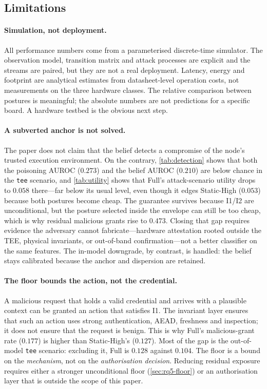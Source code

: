 \subsection{Limitations}
\label{sec:limitations}

\paragraph{Simulation, not deployment.} All performance numbers come from a
parameterised discrete-time simulator. The observation model, transition matrix
and attack processes are explicit and the streams are paired, but they are not a
real deployment. Latency, energy and footprint are analytical estimates from
datasheet-level operation costs, not measurements on the three hardware classes.
The relative comparison between postures is meaningful; the absolute numbers are
not predictions for a specific board. A hardware testbed is the obvious next
step.

\paragraph{A subverted anchor is not solved.} The paper does not claim that the
belief detects a compromise of the node's trusted execution environment. On the
contrary, \cref{tab:detection} shows that both the poisoning AUROC ($0.273$) and
the belief AUROC ($0.210$) are below chance in the \texttt{tee} scenario, and
\cref{tab:utility} shows that Full's attack-scenario utility drops to $0.058$
there---far below its usual level, even though it edges Static-High ($0.053$)
because both postures become cheap. The guarantee survives because I1/I2 are
unconditional, but the posture selected inside the envelope can still be too
cheap, which is why residual malicious grants rise to $0.473$. Closing that gap requires evidence the
adversary cannot fabricate---hardware attestation rooted outside the TEE, physical
invariants, or out-of-band confirmation---not a better classifier on the same
features. The in-model downgrade, by contrast, is handled: the belief stays
calibrated because the anchor and dispersion are retained.

\paragraph{The floor bounds the action, not the credential.} A malicious request
that holds a valid credential and arrives with a plausible context can be granted
an action that satisfies I1. The invariant layer ensures that such an action uses
strong authentication, AEAD, freshness and inspection; it does not ensure that the
request is benign. This is why Full's malicious-grant rate ($0.177$) is higher than
Static-High's ($0.127$). Most of the gap is the out-of-model \texttt{tee} scenario:
excluding it, Full is $0.128$ against $0.104$. The floor is a bound on the
\emph{mechanism}, not on the \emph{authorisation decision}. Reducing residual
exposure requires either a stronger unconditional floor
(\cref{sec:rq5-floor}) or an authorisation layer that is outside the scope of this
paper.


